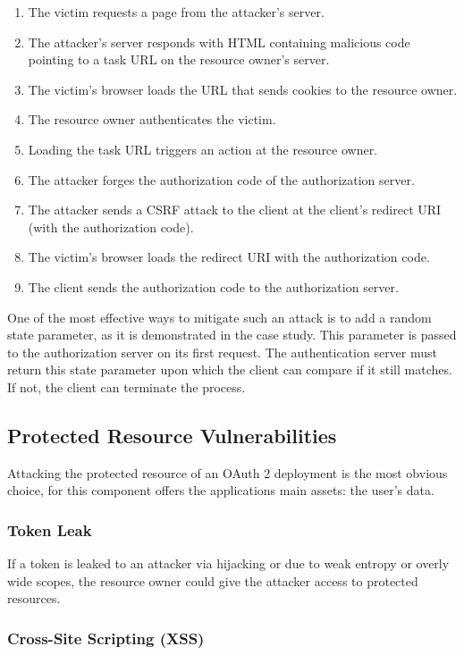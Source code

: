 \begin{enumerate}
  \item The victim requests a page from the attacker's server.
  \item The attacker's server responds with HTML containing malicious code pointing to a task URL on the resource owner's server.
  \item The victim's browser loads the URL that sends cookies to the resource owner.
  \item The resource owner authenticates the victim.
  \item Loading the task URL triggers an action at the resource owner.
  \item The attacker forges the authorization code of the authorization server.
  \item The attacker sends a CSRF attack to the client at the client's redirect URI (with the authorization code).
  \item The victim's browser loads the redirect URI with the authorization code.
  \item The client sends the authorization code to the authorization server.
\end{enumerate}

One of the most effective ways to mitigate such an attack is to add a random state parameter, as it is demonstrated in the case study. This parameter is passed to the authorization server on its first request. The authentication server must return this state parameter upon which the client can compare if it still matches. If not, the client can terminate the process.

\subsection{Protected Resource Vulnerabilities}

Attacking the protected resource of an OAuth 2 deployment is the most obvious choice, for this component offers the applications main assets: the user's data.

\subsubsection{Token Leak}

If a token is leaked to an attacker via hijacking or due to weak entropy or overly wide scopes, the resource owner could give the attacker access to protected resources.

\subsubsection{Cross-Site Scripting (XSS)}

